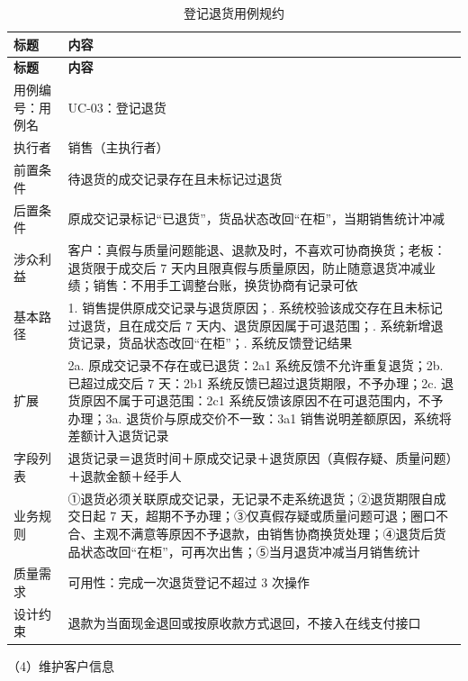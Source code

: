 {\small
\begin{longtable}{@{}L{3.0cm} L{12.3cm}@{}}
\caption{登记退货用例规约}\label{tab:uc-03}\\
\toprule
\textbf{标题} & \textbf{内容} \\
\midrule
\endfirsthead
\toprule
\textbf{标题} & \textbf{内容} \\
\midrule
\endhead
用例编号：用例名 & UC-03：登记退货 \\
\midrule
执行者 & 销售（主执行者） \\
\midrule
前置条件 & 待退货的成交记录存在且未标记过退货 \\
\midrule
后置条件 & 原成交记录标记“已退货”，货品状态改回“在柜”，当期销售统计冲减 \\
\midrule
涉众利益 & 客户：真假与质量问题能退、退款及时，不喜欢可协商换货；\newline 老板：退货限于成交后 7 天内且限真假与质量原因，防止随意退货冲减业绩；\newline 销售：不用手工调整台账，换货协商有记录可依 \\
\midrule
基本路径 & 1. 销售提供原成交记录与退货原因；. 系统校验该成交存在且未标记过退货，且在成交后 7 天内、退货原因属于可退范围；. 系统新增退货记录，货品状态改回“在柜”；. 系统反馈登记结果 \\
\midrule
扩展 & 2a. 原成交记录不存在或已退货：2a1 系统反馈不允许重复退货；\newline 2b. 已超过成交后 7 天：2b1 系统反馈已超过退货期限，不予办理；\newline 2c. 退货原因不属于可退范围：2c1 系统反馈该原因不在可退范围内，不予办理；\newline 3a. 退货价与原成交价不一致：3a1 销售说明差额原因，系统将差额计入退货记录 \\
\midrule
字段列表 & 退货记录＝退货时间＋原成交记录＋退货原因（真假存疑、质量问题）＋退款金额＋经手人 \\
\midrule
业务规则 & ①退货必须关联原成交记录，无记录不走系统退货；\newline ②退货期限自成交日起 7 天，超期不予办理；\newline ③仅真假存疑或质量问题可退；圈口不合、主观不满意等原因不予退款，由销售协商换货处理；\newline ④退货后货品状态改回“在柜”，可再次出售；\newline ⑤当月退货冲减当月销售统计 \\
\midrule
质量需求 & 可用性：完成一次退货登记不超过 3 次操作 \\
\midrule
设计约束 & 退款为当面现金退回或按原收款方式退回，不接入在线支付接口 \\
\midrule
\bottomrule
\end{longtable}}
\noindent（4）维护客户信息

